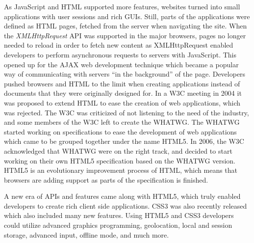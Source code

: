 \documentclass[a4paper,11pt]{kth-mag}
\begin{document}
        As \gls{JavaScript} and \gls{HTML} supported more features, websites turned into small applications with user sessions and rich \glspl{GUI}.
        Still, parts of the applications were defined as \gls{HTML} pages, fetched from the server when navigating the site.
        When the \emph{XMLHttpRequest} \gls{API} was supported in the major \glspl{browser}, pages no longer needed to reload in order to fetch new content as XMLHttpRequest enabled developers to perform asynchronous requests to servers with \gls{JavaScript}.
        This opened up for the \gls{AJAX} \gls{web} development technique which became a popular way of communicating with servers ``in the background'' of the page.
        Developers pushed \glspl{browser} and \gls{HTML} to the limit when creating applications instead of \glspl{document} that they were originally designed for.
        In a \gls{W3C} meeting in 2004 it was proposed to extend \gls{HTML} to ease the creation of \gls{web} applications, which was rejected.
        The \gls{W3C} was criticized of not listening to the need of the industry, and some members of the \gls{W3C} left to create the \gls{WHATWG}.
        The \gls{WHATWG} started working on specifications to ease the development of \gls{web} applications which came to be grouped together under the name \gls{HTML5}.
        In 2006, the \gls{W3C} acknowledged that \gls{WHATWG} were on the right track, and decided to start working on their own \gls{HTML5} specification based on the \gls{WHATWG} version.
        \gls{HTML5} is an evolutionary improvement process of \gls{HTML}, which means that \glspl{browser} are adding support as parts of the specification is finished.

        A new era of \glspl{API} and features came along with \gls{HTML5}, which truly enabled developers to create rich client side applications.
        \gls{CSS3} was also recently released which also included many new features.
        Using \gls{HTML5} and \gls{CSS3} developers could utilize advanced graphics programming, geolocation, local and session storage, advanced input, offline mode, and much more.

\end{document}
